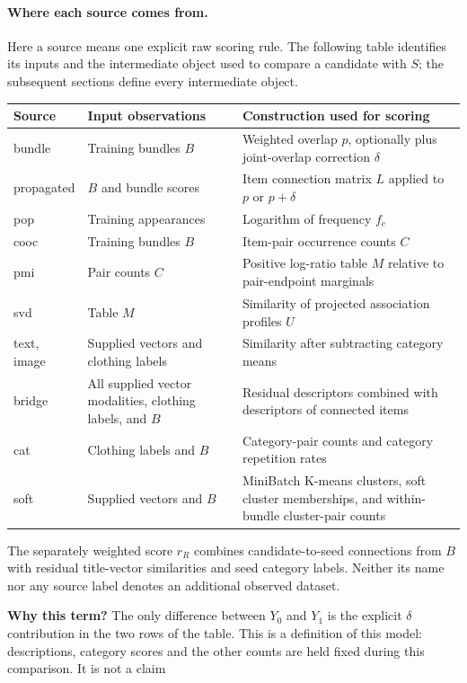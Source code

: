 \documentclass[11pt,a4paper]{article}
\newcommand{\why}{\par\textbf{Why this term?} }
\numberwithin{equation}{section}
\begin{document}
\paragraph{Where each source comes from.}
Here a source means one explicit raw scoring rule. The following table identifies
its inputs and the intermediate object used to compare a candidate with $S$;
the subsequent sections define every intermediate object.
\begin{center}\small
\begin{tabularx}{\linewidth}{@{}lXX@{}}\toprule
Source & Input observations & Construction used for scoring \\\midrule
bundle & Training bundles $B$ & Weighted overlap $p$, optionally plus joint-overlap correction $\delta$ \\
propagated & $B$ and bundle scores & Item connection matrix $L$ applied to $p$ or $p+\delta$ \\
pop & Training appearances & Logarithm of frequency $f_c$ \\
cooc & Training bundles $B$ & Item-pair occurrence counts $C$ \\
pmi & Pair counts $C$ & Positive log-ratio table $M$ relative to pair-endpoint marginals \\
svd & Table $M$ & Similarity of projected association profiles $U$ \\
text, image & Supplied vectors and clothing labels & Similarity after subtracting category means \\
bridge & All supplied vector modalities, clothing labels, and $B$ & Residual descriptors combined with descriptors of connected items \\
cat & Clothing labels and $B$ & Category-pair counts and category repetition rates \\
soft & Supplied vectors and $B$ & MiniBatch K-means clusters, soft cluster memberships, and within-bundle cluster-pair counts \\\bottomrule
\end{tabularx}\end{center}
The separately weighted score $r_R$ combines candidate-to-seed connections from
$B$ with residual title-vector similarities and seed category labels. Neither
its name nor any source label denotes an additional observed dataset.
\why The only difference between $Y_0$ and $Y_1$ is the explicit $\delta$ contribution
in the two rows of the table. This is a definition of this model: descriptions, category
scores and the other counts are held fixed during this comparison. It is not a claim
\end{document}
